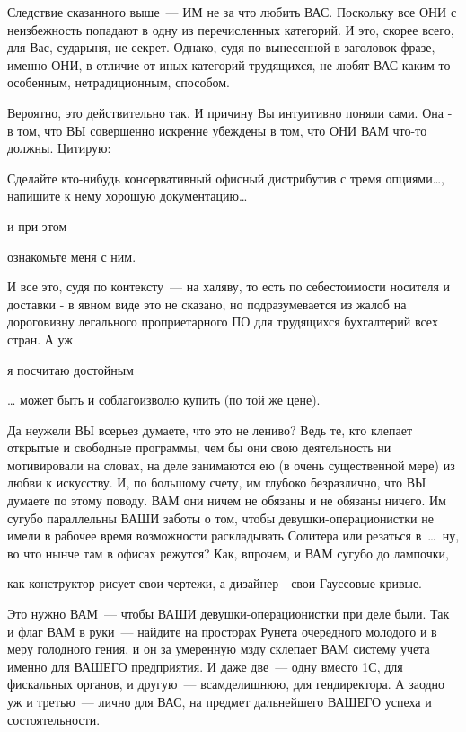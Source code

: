 Следствие сказанного выше~--- ИМ не за что любить ВАС. Поскольку все ОНИ с неизбежность попадают в одну из перечисленных категорий. И это, скорее всего, для Вас, сударыня, не секрет. Однако, судя по вынесенной в заголовок фразе, именно ОНИ, в отличие от иных категорий трудящихся, не любят ВАС каким-то особенным, нетрадиционным, способом.

Вероятно, это действительно так. И причину Вы интуитивно поняли сами. Она - в том, что ВЫ совершенно искренне убеждены в том, что ОНИ ВАМ что-то должны. Цитирую: 


\begin{shadequote}{}
Сделайте кто-нибудь консервативный офисный дистрибутив с тремя опциями\dots, напишите к нему хорошую документацию\dots
\end{shadequote}
и при этом
\begin{shadequote}{}
ознакомьте меня с ним.
\end{shadequote}

И все это, судя по контексту~--- на халяву, то есть по себестоимости носителя и доставки - в явном виде это не сказано, но подразумевается из жалоб на дороговизну легального проприетарного ПО для трудящихся бухгалтерий всех стран. А уж 


\begin{shadequote}{}
 я посчитаю достойным
\end{shadequote}

… может быть и соблагоизволю купить (по той же цене).

Да неужели ВЫ всерьез думаете, что это не лениво? Ведь те, кто клепает открытые и свободные программы, чем бы они свою деятельность ни мотивировали на словах, на деле занимаются ею (в очень существенной мере) из любви к искусству. И, по большому счету, им глубоко безразлично, что ВЫ думаете по этому поводу. ВАМ они ничем не обязаны и не обязаны ничего. Им сугубо параллельны ВАШИ заботы о том, чтобы девушки-операционистки не имели в рабочее время возможности раскладывать Солитера или резаться в~\dots~ну, во что нынче там в офисах режутся? Как, впрочем, и ВАМ сугубо до лампочки, 


\begin{shadequote}{}
как конструктор рисует свои чертежи, а дизайнер - свои Гауссовые кривые.
\end{shadequote}

Это нужно ВАМ~--- чтобы ВАШИ девушки-операционистки при деле были. Так и флаг ВАМ в руки~--- найдите на просторах Рунета очередного молодого и в меру голодного гения, и он за умеренную мзду склепает ВАМ систему учета именно для ВАШЕГО предприятия. И даже две~--- одну вместо 1С, для фискальных органов, и другую~--- всамделишнюю, для гендиректора. А заодно уж и третью~--- лично для ВАС, на предмет дальнейшего ВАШЕГО успеха и состоятельности.

